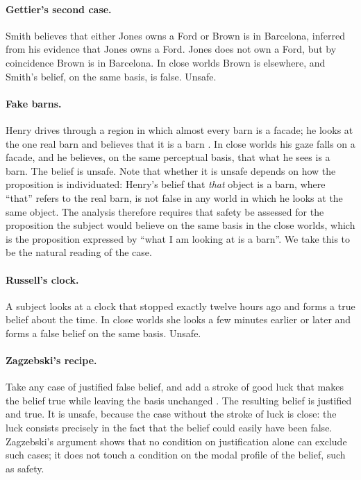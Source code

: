 \documentclass{situationist-preprint}
\begin{document}
\paragraph{Gettier's second case.} Smith believes that either Jones owns a Ford or Brown is in Barcelona, inferred from his evidence that Jones owns a Ford. Jones does not own a Ford, but by coincidence Brown is in Barcelona. In close worlds Brown is elsewhere, and Smith's belief, on the same basis, is false. Unsafe.

\paragraph{Fake barns.} Henry drives through a region in which almost every barn is a facade; he looks at the one real barn and believes that it is a barn \citep{Goldman1976}. In close worlds his gaze falls on a facade, and he believes, on the same perceptual basis, that what he sees is a barn. The belief is unsafe. Note that whether it is unsafe depends on how the proposition is individuated: Henry's belief that \emph{that} object is a barn, where \enquote{that} refers to the real barn, is not false in any world in which he looks at the same object. The analysis therefore requires that safety be assessed for the proposition the subject would believe on the same basis in the close worlds, which is the proposition expressed by \enquote{what I am looking at is a barn}. We take this to be the natural reading of the case.

\paragraph{Russell's clock.} A subject looks at a clock that stopped exactly twelve hours ago and forms a true belief about the time. In close worlds she looks a few minutes earlier or later and forms a false belief on the same basis. Unsafe.

\paragraph{Zagzebski's recipe.} Take any case of justified false belief, and add a stroke of good luck that makes the belief true while leaving the basis unchanged \citep{Zagzebski1994}. The resulting belief is justified and true. It is unsafe, because the case without the stroke of luck is close: the luck consists precisely in the fact that the belief could easily have been false. Zagzebski's argument shows that no condition on justification alone can exclude such cases; it does not touch a condition on the modal profile of the belief, such as safety.
\end{document}
